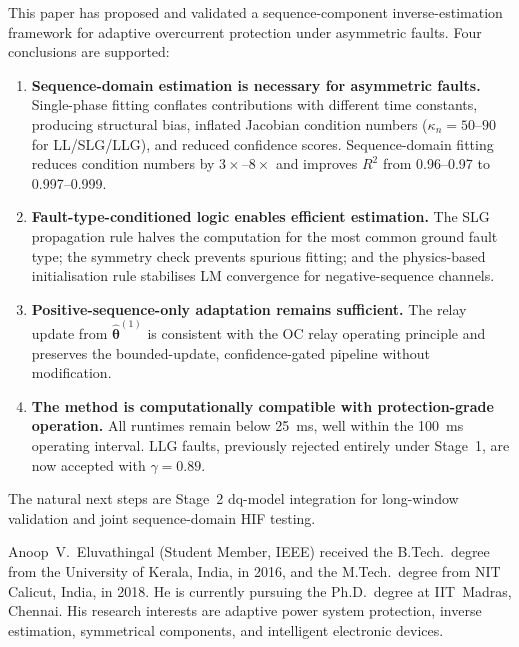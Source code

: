 \documentclass[10pt,journal,twoside]{IEEEtran}
\begin{document}
This paper has proposed and validated a sequence-component inverse-estimation
framework for adaptive overcurrent protection under asymmetric faults.
Four conclusions are supported:

\begin{enumerate}
\item \textbf{Sequence-domain estimation is necessary for asymmetric faults.}
      Single-phase fitting conflates contributions with different time
      constants, producing structural bias, inflated Jacobian condition
      numbers ($\kappa_n = 50$--$90$ for LL/SLG/LLG), and reduced
      confidence scores.  Sequence-domain fitting reduces condition numbers
      by $3\times$--$8\times$ and improves $R^2$ from 0.96--0.97 to 0.997--0.999.

\item \textbf{Fault-type-conditioned logic enables efficient estimation.}
      The SLG propagation rule halves the computation for the most common
      ground fault type; the symmetry check prevents spurious fitting;
      and the physics-based initialisation rule stabilises LM convergence
      for negative-sequence channels.

\item \textbf{Positive-sequence-only adaptation remains sufficient.}
      The relay update from $\hat{\bm\theta}^{(1)}$ is consistent with the
      OC relay operating principle and preserves the bounded-update,
      confidence-gated pipeline without modification.

\item \textbf{The method is computationally compatible with protection-grade
      operation.}  All runtimes remain below 25~ms, well within the 100~ms
      operating interval.  LLG faults, previously rejected entirely under
      Stage~1, are now accepted with $\gamma = 0.89$.
\end{enumerate}

\noindent
The natural next steps are Stage~2 dq-model integration for long-window
validation and joint sequence-domain HIF testing.

\begin{IEEEbiographynophoto}{Anoop~V.~Eluvathingal}
(Student Member, IEEE) received the B.Tech.\ degree from the University of
Kerala, India, in 2016, and the M.Tech.\ degree from NIT Calicut, India,
in 2018.  He is currently pursuing the Ph.D.\ degree at IIT~Madras,
Chennai.  His research interests are adaptive power system protection,
inverse estimation, symmetrical components, and intelligent electronic
devices.
\end{IEEEbiographynophoto}
\end{document}
